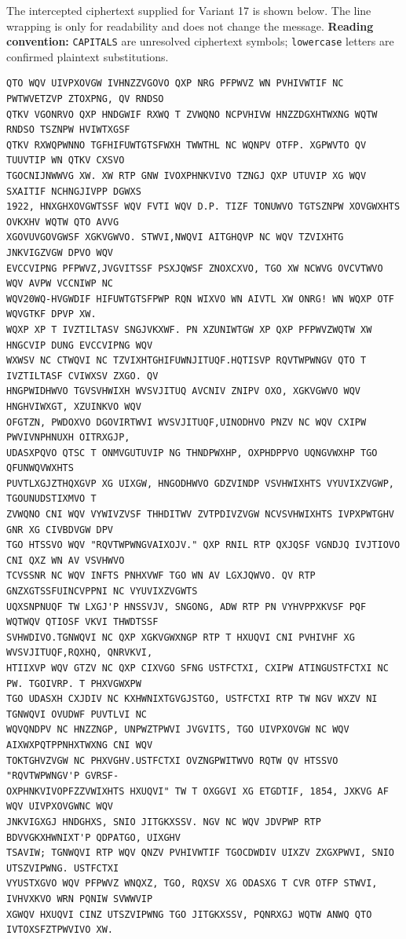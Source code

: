 \documentclass[12pt,a4paper]{article}
\newcommand{\caselegend}{%
  \noindent\textbf{Reading convention: }
  \texttt{CAPITALS} are unresolved ciphertext symbols; 
  \texttt{lowercase} letters are confirmed plaintext substitutions.\par
}
\begin{document}
The intercepted ciphertext supplied for Variant 17 is shown below. The line wrapping is only for readability and does not change the message.
\caselegend
\begin{lstlisting}[style=ciphertext,caption={Variant 17 intercepted ciphertext}]
QTO WQV UIVPXOVGW IVHNZZVGOVO QXP NRG PFPWVZ WN PVHIVWTIF NC PWTWVETZVP ZTOXPNG, QV RNDSO
QTKV VGONRVO QXP HNDGWIF RXWQ T ZVWQNO NCPVHIVW HNZZDGXHTWXNG WQTW RNDSO TSZNPW HVIWTXGSF
QTKV RXWQPWNNO TGFHIFUWTGTSFWXH TWWTHL NC WQNPV OTFP. XGPWVTO QV TUUVTIP WN QTKV CXSVO
TGOCNIJNWWVG XW. XW RTP GNW IVOXPHNKVIVO TZNGJ QXP UTUVIP XG WQV SXAITIF NCHNGJIVPP DGWXS
1922, HNXGHXOVGWTSSF WQV FVTI WQV D.P. TIZF TONUWVO TGTSZNPW XOVGWXHTS OVKXHV WQTW QTO AVVG
XGOVUVGOVGWSF XGKVGWVO. STWVI,NWQVI AITGHQVP NC WQV TZVIXHTG JNKVIGZVGW DPVO WQV
EVCCVIPNG PFPWVZ,JVGVITSSF PSXJQWSF ZNOXCXVO, TGO XW NCWVG OVCVTWVO WQV AVPW VCCNIWP NC
WQV20WQ-HVGWDIF HIFUWTGTSFPWP RQN WIXVO WN AIVTL XW ONRG! WN WQXP OTF WQVGTKF DPVP XW.
WQXP XP T IVZTILTASV SNGJVKXWF. PN XZUNIWTGW XP QXP PFPWVZWQTW XW HNGCVIP DUNG EVCCVIPNG WQV
WXWSV NC CTWQVI NC TZVIXHTGHIFUWNJITUQF.HQTISVP RQVTWPWNGV QTO T IVZTILTASF CVIWXSV ZXGO. QV
HNGPWIDHWVO TGVSVHWIXH WVSVJITUQ AVCNIV ZNIPV OXO, XGKVGWVO WQV HNGHVIWXGT, XZUINKVO WQV
OFGTZN, PWDOXVO DGOVIRTWVI WVSVJITUQF,UINODHVO PNZV NC WQV CXIPW PWVIVNPHNUXH OITRXGJP,
UDASXPQVO QTSC T ONMVGUTUVIP NG THNDPWXHP, OXPHDPPVO UQNGVWXHP TGO QFUNWQVWXHTS
PUVTLXGJZTHQXGVP XG UIXGW, HNGODHWVO GDZVINDP VSVHWIXHTS VYUVIXZVGWP, TGOUNUDSTIXMVO T
ZVWQNO CNI WQV VYWIVZVSF THHDITWV ZVTPDIVZVGW NCVSVHWIXHTS IVPXPWTGHV GNR XG CIVBDVGW DPV
TGO HTSSVO WQV "RQVTWPWNGVAIXOJV." QXP RNIL RTP QXJQSF VGNDJQ IVJTIOVO CNI QXZ WN AV VSVHWVO
TCVSSNR NC WQV INFTS PNHXVWF TGO WN AV LGXJQWVO. QV RTP GNZXGTSSFUINCVPPNI NC VYUVIXZVGWTS
UQXSNPNUQF TW LXGJ'P HNSSVJV, SNGONG, ADW RTP PN VYHVPPXKVSF PQF WQTWQV QTIOSF VKVI THWDTSSF
SVHWDIVO.TGNWQVI NC QXP XGKVGWXNGP RTP T HXUQVI CNI PVHIVHF XG WVSVJITUQF,RQXHQ, QNRVKVI,
HTIIXVP WQV GTZV NC QXP CIXVGO SFNG USTFCTXI, CXIPW ATINGUSTFCTXI NC PW. TGOIVRP. T PHXVGWXPW
TGO UDASXH CXJDIV NC KXHWNIXTGVGJSTGO, USTFCTXI RTP TW NGV WXZV NI TGNWQVI OVUDWF PUVTLVI NC
WQVQNDPV NC HNZZNGP, UNPWZTPWVI JVGVITS, TGO UIVPXOVGW NC WQV AIXWXPQTPPNHXTWXNG CNI WQV
TOKTGHVZVGW NC PHXVGHV.USTFCTXI OVZNGPWITWVO RQTW QV HTSSVO "RQVTWPWNGV'P GVRSF-
OXPHNKVIVOPFZZVWIXHTS HXUQVI" TW T OXGGVI XG ETGDTIF, 1854, JXKVG AF WQV UIVPXOVGWNC WQV
JNKVIGXGJ HNDGHXS, SNIO JITGKXSSV. NGV NC WQV JDVPWP RTP BDVVGKXHWNIXT'P QDPATGO, UIXGHV
TSAVIW; TGNWQVI RTP WQV QNZV PVHIVWTIF TGOCDWDIV UIXZV ZXGXPWVI, SNIO UTSZVIPWNG. USTFCTXI
VYUSTXGVO WQV PFPWVZ WNQXZ, TGO, RQXSV XG ODASXG T CVR OTFP STWVI, IVHVXKVO WRN PQNIW SVWWVIP
XGWQV HXUQVI CINZ UTSZVIPWNG TGO JITGKXSSV, PQNRXGJ WQTW ANWQ QTO IVTOXSFZTPWVIVO XW.
\end{lstlisting}
\end{document}
